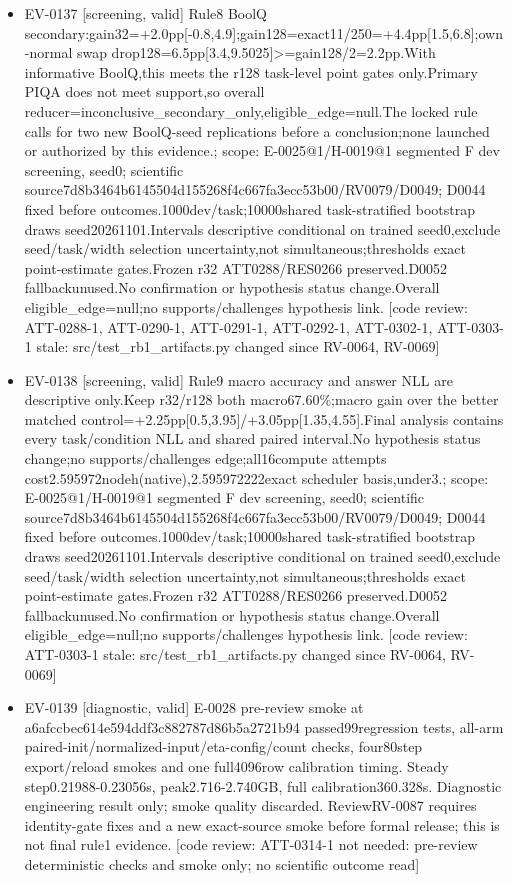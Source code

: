 \documentclass[11pt]{article}
\begin{document}
\begin{itemize}
\item EV-0137 [screening, valid] Rule8 BoolQ secondary:gain32=+2.0pp[-0.8,4.9];gain128=exact11/250=+4.4pp[1.5,6.8];own-normal swap drop128=6.5pp[3.4,9.5025]\textgreater{}=gain128/2=2.2pp.With informative BoolQ,this meets the r128 task-level point gates only.Primary PIQA does not meet support,so overall reducer=inconclusive\_secondary\_only,eligible\_edge=null.The locked rule calls for two new BoolQ-seed replications before a conclusion;none launched or authorized by this evidence.; scope: E-0025@1/H-0019@1 segmented F dev screening, seed0; scientific source7d8b3464b6145504d155268f4c667fa3ecc53b00/RV0079/D0049; D0044 fixed before outcomes.1000dev/task;10000shared task-stratified bootstrap draws seed20261101.Intervals descriptive conditional on trained seed0,exclude seed/task/width selection uncertainty,not simultaneous;thresholds exact point-estimate gates.Frozen r32 ATT0288/RES0266 preserved.D0052 fallbackunused.No confirmation or hypothesis status change.Overall eligible\_edge=null;no supports/challenges hypothesis link. [code review: ATT-0288-1, ATT-0290-1, ATT-0291-1, ATT-0292-1, ATT-0302-1, ATT-0303-1 stale: src/test\_rb1\_artifacts.py changed since RV-0064, RV-0069]
\item EV-0138 [screening, valid] Rule9 macro accuracy and answer NLL are descriptive only.Keep r32/r128 both macro67.60\%;macro gain over the better matched control=+2.25pp[0.5,3.95]/+3.05pp[1.35,4.55].Final analysis contains every task/condition NLL and shared paired interval.No hypothesis status change;no supports/challenges edge;all16compute attempts cost2.595972nodeh(native),2.595972222exact scheduler basis,under3.; scope: E-0025@1/H-0019@1 segmented F dev screening, seed0; scientific source7d8b3464b6145504d155268f4c667fa3ecc53b00/RV0079/D0049; D0044 fixed before outcomes.1000dev/task;10000shared task-stratified bootstrap draws seed20261101.Intervals descriptive conditional on trained seed0,exclude seed/task/width selection uncertainty,not simultaneous;thresholds exact point-estimate gates.Frozen r32 ATT0288/RES0266 preserved.D0052 fallbackunused.No confirmation or hypothesis status change.Overall eligible\_edge=null;no supports/challenges hypothesis link. [code review: ATT-0303-1 stale: src/test\_rb1\_artifacts.py changed since RV-0064, RV-0069]
\item EV-0139 [diagnostic, valid] E-0028 pre-review smoke at a6afccbec614e594ddf3c882787d86b5a2721b94 passed99regression tests, all-arm paired-init/normalized-input/eta-config/count checks, four80step export/reload smokes and one full4096row calibration timing. Steady step0.21988-0.23056s, peak2.716-2.740GB, full calibration360.328s. Diagnostic engineering result only; smoke quality discarded. ReviewRV-0087 requires identity-gate fixes and a new exact-source smoke before formal release; this is not final rule1 evidence. [code review: ATT-0314-1 not needed: pre-review deterministic checks and smoke only; no scientific outcome read]

\end{itemize}
\end{document}
